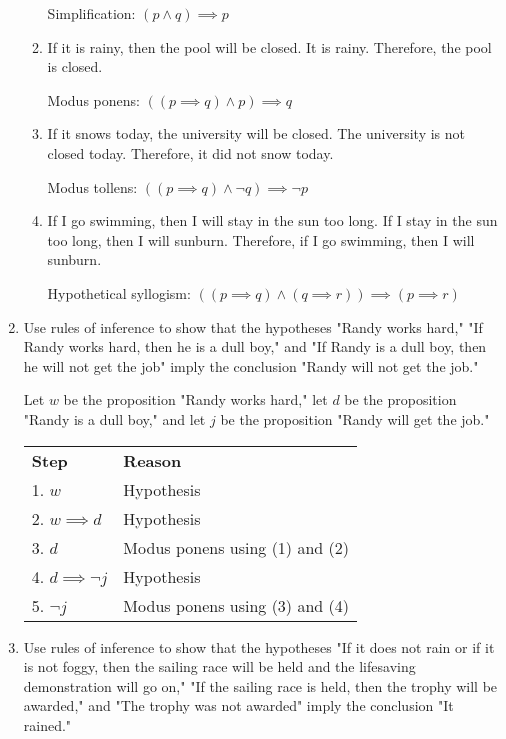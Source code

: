 \documentclass[11pt]{article}
\begin{document}
\begin{enumerate}[label=\textbf{\arabic*.}]
\begin{enumerate}[label=\textbf{\alph*)}]
		Simplification: $(p \land q) \implies p$
		
		\item If it is rainy, then the pool will be closed. It is rainy. Therefore, the pool is closed.
		
		Modus ponens: $((p \implies q) \land p) \implies q$
		
		\item If it snows today, the university will be closed. The university is not closed today. Therefore, it did not snow today.
		
		Modus tollens: $((p \implies q) \land \neg q) \implies \neg p$
		
		\item If I go swimming, then I will stay in the sun too long. If I stay in the sun too long, then I will sunburn. Therefore, if I go swimming, then I will sunburn.
		
		Hypothetical syllogism: $((p \implies q) \land (q \implies r)) \implies (p \implies r)$
	\end{enumerate}

	\item Use rules of inference to show that the hypotheses "Randy works hard," "If Randy works hard, then he is a dull boy," and "If Randy is a dull boy, then he will not get the job" imply the conclusion "Randy will not get the job."
	
	Let $w$ be the proposition "Randy works hard," let $d$ be the proposition "Randy is a dull boy," and let $j$ be the proposition "Randy will get the job."
	
	\begin{center}
	\begin{tabular}{ll}
		\textbf{Step} & \textbf{Reason} \\
		1. $w$ & Hypothesis \\
		2. $w \implies d$ & Hypothesis \\
		3. $d$ & Modus ponens using (1) and (2) \\
		4. $d \implies \neg j$ & Hypothesis \\
		5. $\neg j$ & Modus ponens using (3) and (4)
	\end{tabular}
	\end{center}

	\item Use rules of inference to show that the hypotheses "If it does not rain or if it is not foggy, then the sailing race will be held and the lifesaving demonstration will go on," "If the sailing race is held, then the trophy will be awarded," and "The trophy was not awarded" imply the conclusion "It rained."
	

\end{enumerate}
\end{document}
